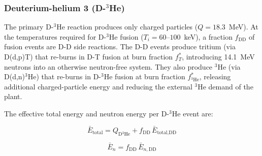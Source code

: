 \documentclass{article}
\begin{document}
\subsubsection{\texorpdfstring{Deuterium-helium 3 (D-${}^3$He)}{Deuterium-helium 3 (D-3He)}}
The primary D-${}^3$He reaction produces only charged particles
($Q = 18.3$~MeV). At the temperatures required for D-${}^3$He fusion
($T_i = 60$--$100$~keV), a fraction $f_{\text{DD}}$ of fusion events
are D-D side reactions. The D-D events produce tritium (via
D(d,p)T) that re-burns in D-T fusion at burn fraction
$f_T^*$, introducing 14.1~MeV neutrons into an
otherwise neutron-free system. They also produce ${}^3$He
(via D(d,n)${}^3$He) that re-burns in D-${}^3$He fusion at burn
fraction $f_{{}^3\text{He}}^*$, releasing additional
charged-particle energy and reducing the external ${}^3$He demand
of the plant.

The effective total energy and neutron energy per D-${}^3$He event are:

\begin{equation}
\label{eq:dhe3-etotal}
\bar{E}_{\text{total}} = Q_{\text{D}{}^3\text{He}}
  + f_{\text{DD}} \, \bar{E}_{\text{total,DD}}
\end{equation}

\begin{equation}
\label{eq:dhe3-eneutron}
\bar{E}_n = f_{\text{DD}} \, \bar{E}_{n,\text{DD}}
\end{equation}
\end{document}
